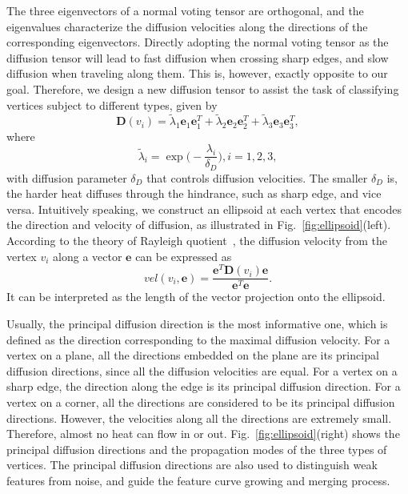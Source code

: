 \documentclass[10pt,journal,cspaper,compsoc]{IEEEtran}
\begin{document}
The three eigenvectors of a normal voting tensor are orthogonal, and
the eigenvalues characterize the diffusion velocities along the
directions of the corresponding eigenvectors. Directly adopting the
normal voting tensor as the diffusion tensor will lead to fast
diffusion when crossing sharp edges, and slow diffusion when traveling
along them. This is, however, exactly opposite to our goal. Therefore,
we design a new diffusion tensor to assist the task of classifying
vertices subject to different types, given by
\begin{equation}\label{eq:DT}
\textbf{D}(v_i) =\widetilde{\lambda}_1 \textbf{e}_1 \textbf{e}^T_1 +\widetilde{\lambda}_2 \textbf{e}_2 \textbf{e}^T_2 +\widetilde{\lambda}_3 \textbf{e}_3 \textbf{e}^T_3 ,
\end{equation}
where
\begin{equation}\label{eq:lambda}
\widetilde{\lambda}_i= \exp\Big(-\frac{\lambda_i}{\delta_D}\Big) , i=1,2,3,
\end{equation}
with diffusion parameter $\delta_D$ that controls diffusion
velocities. The smaller $\delta_D$ is, the harder heat diffuses
through the hindrance, such as sharp edge, and vice versa.
Intuitively speaking, we construct an ellipsoid at each vertex that
encodes the direction and velocity of diffusion, as illustrated in
Fig.~\ref{fig:ellipsoid}(left). According to the theory of Rayleigh
quotient~\cite{HJ85}, the diffusion velocity from the vertex $v_i$
along a vector $\textbf{e}$ can be expressed as
\begin{equation}\label{eq:DV}
vel(v_i,\textbf{e})=
\frac{\textbf{e}^T\textbf{D}(v_i)\textbf{e}}{{\textbf{e}}^T\textbf{e}}.
\end{equation}
It can be interpreted as the length of the vector projection onto the
ellipsoid.

Usually, the principal diffusion direction is the most informative
one, which is defined as the direction corresponding to the maximal
diffusion velocity. For a vertex on a plane, all the directions
embedded on the plane are its principal diffusion directions, since
all the diffusion velocities are equal. For a vertex on a sharp edge,
the direction along the edge is its principal diffusion direction. For
a vertex on a corner, all the directions are considered to be its
principal diffusion directions. However, the velocities along all the
directions are extremely small. Therefore, almost no heat can flow in
or out. Fig.~\ref{fig:ellipsoid}(right) shows the principal diffusion
directions and the propagation modes of the three types of vertices.
The principal diffusion directions are also used to distinguish weak
features from noise, and guide the feature curve growing and merging
process.
\end{document}
